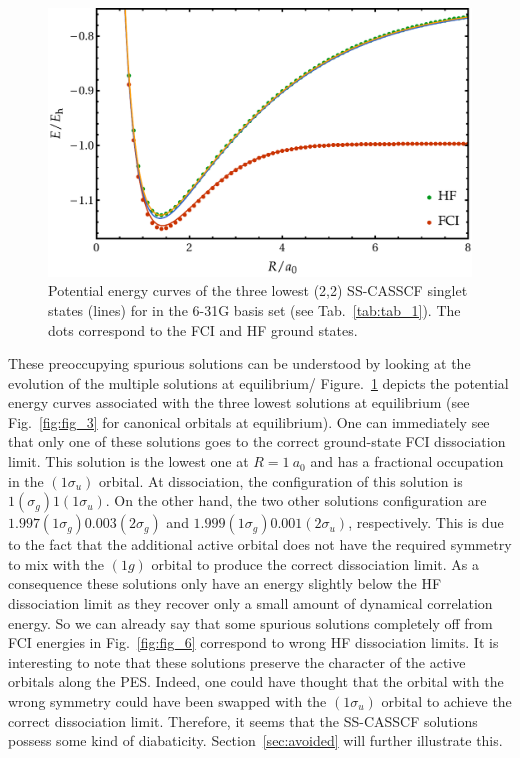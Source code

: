 \documentclass[aps,prb,reprint,showkeys,superscriptaddress]{revtex4-1}
\begin{document}
\begin{figure}
  \centering
  \includegraphics[width=0.9\linewidth]{Figures/fig_5.pdf}
  \caption{Potential energy curves of the three lowest (2,2) SS-CASSCF singlet states (lines) for  in the 6-31G basis set (see Tab.~\ref{tab:tab_1}). The dots correspond to the FCI and HF ground states. \label{fig:fig_7}}
\end{figure}

These preoccupying spurious solutions can be understood by looking at the evolution of the multiple solutions at equilibrium/
Figure.~\ref{fig:fig_7} depicts the potential energy curves associated with the three lowest solutions at equilibrium (see Fig.~\ref{fig:fig_3} for canonical orbitals at equilibrium).
One can immediately see that only one of these solutions goes to the correct ground-state FCI dissociation limit.
This solution is the lowest one at $R=1~a_0$ and has a fractional occupation in the $(1\sigma_u)$ orbital.
At dissociation, the configuration of this solution is $1(\sigma_g)1(1\sigma_u)$.
On the other hand, the two other solutions configuration are $1.997(1\sigma_g)0.003(2\sigma_g)$ and $1.999(1\sigma_g)0.001(2\sigma_u)$, respectively.
This is due to the fact that the additional active orbital does not have the required symmetry to mix with the $(1g)$ orbital to produce the correct dissociation limit.
As a consequence these solutions only have an energy slightly below the HF dissociation limit as they recover only a small amount of dynamical correlation energy.
So we can already say that some spurious solutions completely off from FCI energies in Fig.~\ref{fig:fig_6} correspond to wrong HF dissociation limits.
It is interesting to note that these solutions preserve the character of the active orbitals along the PES.
Indeed, one could have thought that the orbital with the wrong symmetry could have been swapped with the $(1\sigma_u)$ orbital to achieve the correct dissociation limit.
Therefore, it seems that the SS-CASSCF solutions possess some kind of diabaticity.
Section~\ref{sec:avoided} will further illustrate this.
\end{document}
